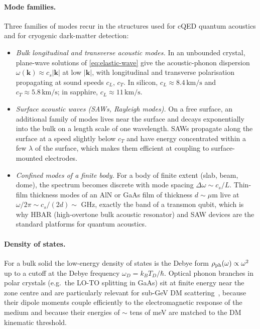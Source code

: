 \paragraph{Mode families.}
Three families of modes recur in the structures used for cQED
quantum acoustics and for cryogenic dark-matter detection:
\begin{itemize}
  \item \emph{Bulk longitudinal and transverse acoustic modes.}
        In an unbounded crystal, plane-wave solutions of
        \cref{eq:elastic-wave} give the acoustic-phonon
        dispersion $\omega(\bm k)\approx c_s |\bm k|$ at low
        $|\bm k|$, with longitudinal and transverse polarisation
        propagating at sound speeds $c_L,\,c_T$. In silicon,
        $c_L\approx 8.4\,\text{km/s}$ and
        $c_T\approx 5.8\,\text{km/s}$; in sapphire,
        $c_L\approx 11\,\text{km/s}$.
  \item \emph{Surface acoustic waves (SAWs, Rayleigh modes).}
        On a free surface, an additional family of modes lives
        near the surface and decays exponentially into the bulk
        on a length scale of one wavelength. SAWs propagate
        along the surface at a speed slightly below $c_T$ and
        have energy concentrated within a few $\lambda$ of the
        surface, which makes them efficient at coupling to
        surface-mounted electrodes.
  \item \emph{Confined modes of a finite body.}
        For a body of finite extent (slab, beam, dome), the
        spectrum becomes discrete with mode spacing
        $\Delta\omega\sim c_s/L$. Thin-film thickness modes of an
        AlN or GaAs film of thickness $d\sim\mu\text{m}$ live at
        $\omega/2\pi\sim c_s/(2d)\sim$ GHz, exactly the band of
        a transmon qubit, which is why HBAR (high-overtone bulk
        acoustic resonator) and SAW devices are the standard
        platforms for quantum acoustics.
\end{itemize}

\paragraph{Density of states.}
For a bulk solid the low-energy density of states is the Debye
form $\rho_{\rm ph}(\omega)\propto\omega^2$ up to a cutoff at the
Debye frequency $\omega_D=k_B T_D/\hbar$. Optical phonon branches
in polar crystals (e.g.\ the LO-TO splitting in GaAs) sit at
finite energy near the zone centre and are particularly relevant
for sub-GeV DM scattering~\cite{knapen2018}, because their dipole
moments couple efficiently to the electromagnetic response of
the medium and because their energies of $\sim$ tens of meV are
matched to the DM kinematic threshold.


